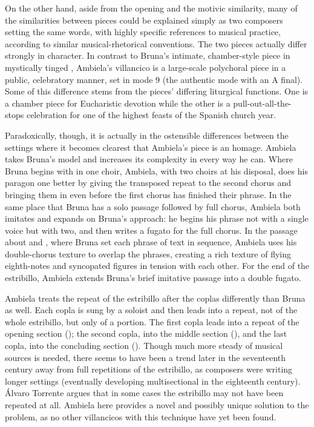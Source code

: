 
On the other hand, aside from the opening and the motivic similarity, many of
the similarities between pieces could be explained simply as two composers
setting the same words, with highly specific references to musical practice,
according to similar musical-rhetorical conventions.
The two pieces actually differ strongly in character.
In contrast to Bruna's intimate, chamber-style piece in mystically tinged
, Ambiela's villancico is a large-scale polychoral piece in
a public, celebratory manner, set in mode 9 (the authentic mode with an A
final).
Some of this difference stems from the pieces' differing liturgical functions. 
One is a chamber piece for Eucharistic devotion while the other is a
pull-out-all-the-stops celebration for one of the highest feasts of the Spanish
church year.

Paradoxically, though, it is actually in the ostensible differences between the
settings where it becomes clearest that Ambiela's piece is an homage.
Ambiela takes Bruna's model and increases its complexity in every way he can.
Where Bruna begins with  in one choir, Ambiela, with two choirs
at his disposal, does his paragon one better by giving the transposed repeat to
the second chorus and bringing them in even before the first chorus has
finished their phrase.
In the same place that Bruna has a solo passage followed by full chorus,
Ambiela both imitates and expands on Bruna's approach: he begins his phrase not
with a single voice but with two, and then writes a fugato for the full chorus.
In the passage about  and , where Bruna set
each phrase of text in sequence, Ambiela uses his double-chorus texture to
overlap the phrases, creating a rich texture of flying eighth-notes and
syncopated figures in tension with each other.
For the end of the estribillo, Ambiela extends Bruna's brief imitative passage
into a double fugato.

Ambiela treats the repeat of the estribillo after the coplas differently than
Bruna as well.
Each copla is sung by a soloist and then leads into a repeat, not of the whole
estribillo, but only of a portion.
The first copla leads into a repeat of the
opening section (); the second copla, into the middle section
(), and the last copla, into the concluding section
().
Though much more steady of musical sources is needed, there seems to have been
a trend later in the seventeenth century away from full repetitions of the
estribillo, as composers were writing longer settings (eventually developing
multisectional  in the eighteenth century).
Álvaro Torrente argues that in some cases the estribillo may not have been
repeated at all.%
Ambiela here provides a novel and possibly unique solution to the problem, as
no other villancicos with this technique have yet been found.


